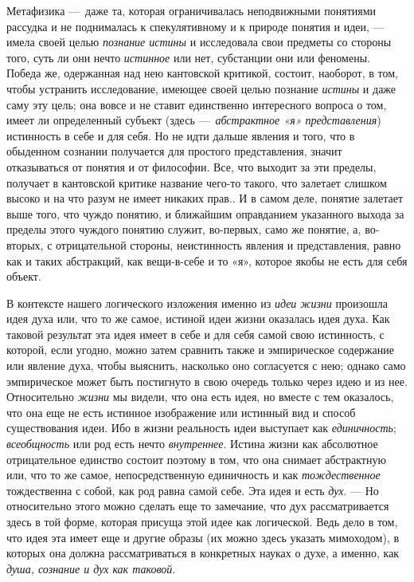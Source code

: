 \documentclass[twoside]{article}
\begin{document}
{Метафизика —~даже та, которая ограничивалась
неподвижными понятиями рассудка и не поднималась к спекулятивному и к
природе понятия и идеи, — имела своей целью
{\em познание истины} и
исследовала свои предметы со стороны того, суть ли они нечто
{\em истинное} или нет,
субстанции они или феномены. Победа же, одержанная над нею кантовской
критикой, состоит, наоборот, в том, чтобы устранить исследование, имеющее
своей целью познание {\em истины}
и даже саму эту цель; она вовсе и не ставит единственно
интересного вопроса о том, имеет ли определенный субъект (здесь
—~{\em абстрактное «я» представления})
истинность в себе и для себя. Но не идти дальше явления и
того, что в обыденном сознании получается для простого представления,
значит отказываться от понятия и от философии. Все, что выходит за эти
пределы, получает в кантовской критике название чего-то такого, что
залетает слишком высоко и на что разум не имеет никаких прав.. И в самом
деле, понятие залетает выше того, что чуждо понятию, и ближайшим
оправданием указанного выхода за пределы этого чуждого понятию служит,
во-первых, само же понятие, а, во-вторых, с отрицательной
стороны, неистинность явления и представления, равно как и таких
абстракций, как вещи-в-себе и то «я», которое якобы не есть для себя
объект.

В контексте нашего логического изложения именно из
{\em идеи жизни}
произошла идея духа или, что то же самое, истиной идеи жизни
оказалась идея духа. Как таковой результат эта идея имеет в себе и для себя
самой свою истинность, с которой, если угодно, можно затем сравнить также и
эмпирическое содержание или явление духа, чтобы выяснить, насколько оно
согласуется с нею; однако само эмпирическое может быть постигнуто в свою
очередь только через идею и из нее. Относительно
{\em жизни} мы видели,
что она есть идея, но вместе с тем оказалось, что она еще не есть истинное
изображение или истинный вид и способ существования идеи. Ибо в жизни
реальность идеи выступает как
{\em единичность};
{\em всеобщность} или род
есть нечто {\em внутреннее}.
Истина жизни как абсолютное отрицательное единство состоит
поэтому в том, что она снимает абстрактную или, что то же самое,
непосредственную единичность и как
{\em тождественное}
тождественна с собой, как род равна самой себе. Эта идея и
есть {\em дух}. — Но
относительно этого можно сделать еще то замечание, что дух рассматривается
здесь в той форме, которая присуща этой идее как логической. Ведь дело в
том, что идея эта имеет еще и другие образы (их можно здесь указать
мимоходом), в которых она должна рассматриваться в конкретных науках о
духе, а именно, как {\em душа, сознание
и дух как таковой}.

}
\end{document}
